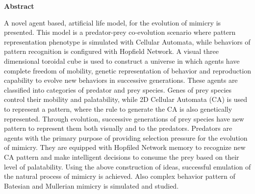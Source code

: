 \newpage
{} \label{abstract}
\setcounter{page}{3}

\begin{center}
\begin{large}
\textbf{Abstract}
\end{large}
\end{center}

A novel agent based, artificial life model, for the evolution of mimicry is presented. This model is a predator-prey co-evolution scenario where pattern representation phenotype is simulated with Cellular Automata, while behaviors of pattern recognition is configured with Hopfield Network. A visual three dimensional toroidal cube is used to construct a universe in which agents have complete freedom of mobility, genetic representation of behavior and reproduction capability to evolve new behaviors in successive generations. These agents are classified into categories of predator and prey species. Genes of prey species control their mobility and palatability, while 2D Cellular Automata (CA) is used to represent a pattern, where the rule to generate the CA is also genetically represented. Through evolution, successive generations of prey species have new pattern to represent them both visually and to the predators. Predators are agents with the primary purpose of providing selection pressure for the evolution of mimicry. They are equipped with Hopfiled Network memory to recognize new CA pattern and make intelligent decisions to consume the prey based on their level of palatability. Using the above construction of ideas, successful emulation of the natural process of mimicry is achieved. Also complex behavior pattern of Batesian and Mullerian mimicry is simulated and studied.